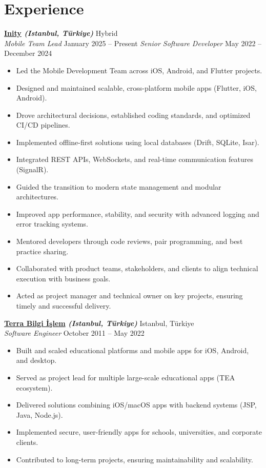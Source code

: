 \documentclass[10pt,a4paper]{extarticle}
\begin{document}
\section{Experience}
\vspace{5pt}
\textbf{\href{https://inity.com.tr}{Inity} \textit{(Istanbul, Türkiye)}} \hfill Hybrid\\
\textit{Mobile Team Lead} \hfill January 2025 -- Present
\textit{Senior Software Developer} \hfill May 2022 -- December 2024
\vspace{5pt}
\begin{itemize}[leftmargin=*,noitemsep,topsep=0pt]
    \item Led the Mobile Development Team across iOS, Android, and Flutter projects.
	\item Designed and maintained scalable, cross-platform mobile apps (Flutter, iOS, Android).
	\item Drove architectural decisions, established coding standards, and optimized CI/CD pipelines.
	\item Implemented offline-first solutions using local databases (Drift, SQLite, Isar).
	\item Integrated REST APIs, WebSockets, and real-time communication features (SignalR).
	\item Guided the transition to modern state management and modular architectures.
	\item Improved app performance, stability, and security with advanced logging and error tracking systems.
	\item Mentored developers through code reviews, pair programming, and best practice sharing.
	\item Collaborated with product teams, stakeholders, and clients to align technical execution with business goals.
\item Acted as project manager and technical owner on key projects, ensuring timely and successful delivery.
\end{itemize}
\vspace{15pt}
\textbf{\href{https://www.terrabilgiisilem}{Terra Bilgi İşlem} \textit{(Istanbul, Türkiye)}} \hfill Istanbul, Türkiye\\
\textit{Software Engineer} \hfill October 2011 -- May 2022
\vspace{5pt}
\begin{itemize}[leftmargin=*,noitemsep,topsep=0pt]
    \item Built and scaled educational platforms and mobile apps for iOS, Android, and desktop.
	\item Served as project lead for multiple large-scale educational apps (TEA ecosystem).
	\item Delivered solutions combining iOS/macOS apps with backend systems (JSP, Java, Node.js).
	\item Implemented secure, user-friendly apps for schools, universities, and corporate clients.
	\item Contributed to long-term projects, ensuring maintainability and scalability.
\end{itemize}
\end{document}

